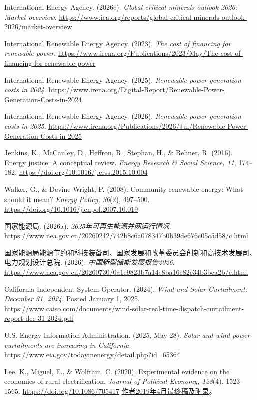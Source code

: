 \documentclass[UTF8,fontset=windows,12pt,a4paper,oneside,openany]{ctexbook}
\begin{document}
International Energy Agency. (2026c). \emph{Global critical minerals outlook 2026: Market overview}. \url{https://www.iea.org/reports/global-critical-minerals-outlook-2026/market-overview}

International Renewable Energy Agency. (2023). \emph{The cost of financing for renewable power}. \url{https://www.irena.org/Publications/2023/May/The-cost-of-financing-for-renewable-power}

International Renewable Energy Agency. (2025). \emph{Renewable power generation costs in 2024}. \url{https://www.irena.org/Digital-Report/Renewable-Power-Generation-Costs-in-2024}

International Renewable Energy Agency. (2026). \emph{Renewable power generation costs in 2025}. \url{https://www.irena.org/Publications/2026/Jul/Renewable-Power-Generation-Costs-in-2025}

Jenkins, K., McCauley, D., Heffron, R., Stephan, H., \& Rehner, R. (2016). Energy justice: A conceptual review. \emph{Energy Research \& Social Science, 11}, 174–182. \url{https://doi.org/10.1016/j.erss.2015.10.004}

Walker, G., \& Devine-Wright, P. (2008). Community renewable energy: What should it mean? \emph{Energy Policy, 36}(2), 497–500. \url{https://doi.org/10.1016/j.enpol.2007.10.019}

国家能源局. (2026a). \emph{2025年可再生能源并网运行情况}. \url{https://www.nea.gov.cn/20260212/742b8c6a078347b0b39de676c05c5d58/c.html}

国家能源局能源节约和科技装备司、国家发展和改革委员会创新和高技术发展司、电力规划设计总院. (2026). \emph{中国新型储能发展报告2026}. \url{https://www.nea.gov.cn/20260730/0a1e9823b7a14e8ba16e82c34b3bea2b/c.html}

California Independent System Operator. (2024). \emph{Wind and Solar Curtailment: December 31, 2024}. Posted January 1, 2025. \url{https://www.caiso.com/documents/wind-solar-real-time-dispatch-curtailment-report-dec-31-2024.pdf}

U.S. Energy Information Administration. (2025, May 28). \emph{Solar and wind power curtailments are increasing in California}. \url{https://www.eia.gov/todayinenergy/detail.php?id=65364}

Lee, K., Miguel, E., \& Wolfram, C. (2020). Experimental evidence on the economics of rural electrification. \emph{Journal of Political Economy, 128}(4), 1523–1565. \url{https://doi.org/10.1086/705417} \href{https://emiguel.econ.berkeley.edu/assets/miguel_research/74/REPP_2019-04-25-FINAL-All.pdf}{作者2019年4月最终稿及附录}。
\end{document}
